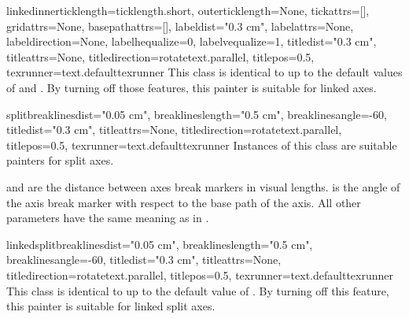 \begin{classdesc}{linked}{innerticklength=ticklength.short,
                          outerticklength=None,
                          tickattrs=[],
                          gridattrs=None,
                          basepathattrs=[],
                          labeldist="0.3 cm",
                          labelattrs=None,
                          labeldirection=None,
                          labelhequalize=0,
                          labelvequalize=1,
                          titledist="0.3 cm",
                          titleattrs=None,
                          titledirection=rotatetext.parallel,
                          titlepos=0.5,
                          texrunner=text.defaulttexrunner}
  This class is identical to  up to the default values of
   and . By turning off those
  features, this painter is suitable for linked axes.
\end{classdesc}

\begin{classdesc}{split}{breaklinesdist="0.05 cm",
                         breaklineslength="0.5 cm",
                         breaklinesangle=-60,
                         titledist="0.3 cm",
                         titleattrs=None,
                         titledirection=rotatetext.parallel,
                         titlepos=0.5,
                         texrunner=text.defaulttexrunner}
  Instances of this class are suitable painters for split axes.

   and  are the distance
  between axes break markers in visual \PyX{} lengths.
   is the angle of the axis break marker with
  respect to the base path of the axis. All other parameters have the
  same meaning as in .
\end{classdesc}

\begin{classdesc}{linkedsplit}{breaklinesdist="0.05 cm",
                               breaklineslength="0.5 cm",
                               breaklinesangle=-60,
                               titledist="0.3 cm",
                               titleattrs=None,
                               titledirection=rotatetext.parallel,
                               titlepos=0.5,
                               texrunner=text.defaulttexrunner}
  This class is identical to  up to the default value of
  . By turning off this feature, this painter is
  suitable for linked split axes.
\end{classdesc}

